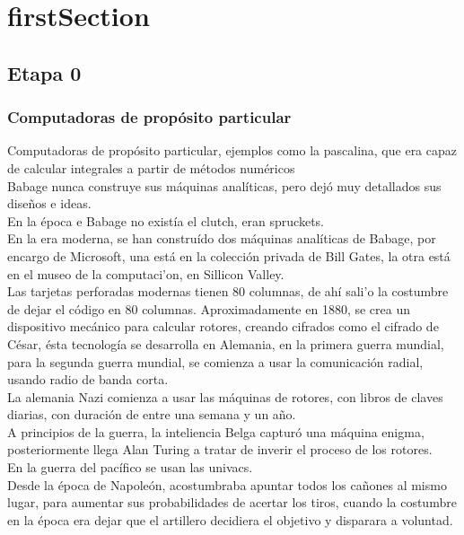 \newpage

\part{\acrlong{firstSection}}
\chapter{Etapa 0}
\section{Computadoras de prop\'{o}sito particular}
Computadoras de prop\'{o}sito particular, ejemplos como la pascalina, que era capaz de calcular integrales a partir de m\'{e}todos num\'{e}ricos\\
Babage nunca construye sus m\'{a}quinas anal\'{i}ticas, pero dej\'{o} muy detallados sus dise\~{n}os e ideas.\\
En la \'{e}poca e Babage no exist\'{i}a el clutch, eran spruckets.\\
En la era moderna, se han constru\'{i}do dos m\'{a}quinas anal\'{i}ticas de Babage, por encargo de Microsoft, una est\'{a} en la colecci\'{o}n privada de Bill Gates, la otra est\'{a} en el museo de la computaci'{o}n, en Sillicon Valley.\\ %
Las tarjetas perforadas modernas tienen 80 columnas, de ah\'{i} sali'{o} la costumbre de dejar el c\'{o}digo en 80 columnas.
Aproximadamente en 1880, se crea un dispositivo mec\'{a}nico para calcular rotores, creando cifrados como el cifrado de C\'{e}sar, \'{e}sta tecnolog\'{i}a se desarrolla en Alemania, en la primera guerra mundial, para la segunda guerra mundial, se comienza a usar la comunicaci\'{o}n radial, usando radio de banda corta.\\
La alemania Nazi comienza a usar las m\'{a}quinas de rotores, con libros de claves diarias, con duraci\'{o}n de entre una semana y un a\~{n}o.\\
A principios de la guerra, la inteliencia Belga captur\'{o} una m\'{a}quina enigma, posteriormente llega Alan Turing a tratar de inverir el proceso de los rotores.\\
En la guerra del pac\'{i}fico se usan las univacs.\\
Desde la \'{e}poca de Napole\'{o}n, acostumbraba apuntar todos los ca\~{n}ones al mismo lugar, para aumentar sus probabilidades de acertar los tiros, cuando la costumbre en la \'{e}poca era dejar que el artillero decidiera el objetivo y disparara a voluntad.\\
